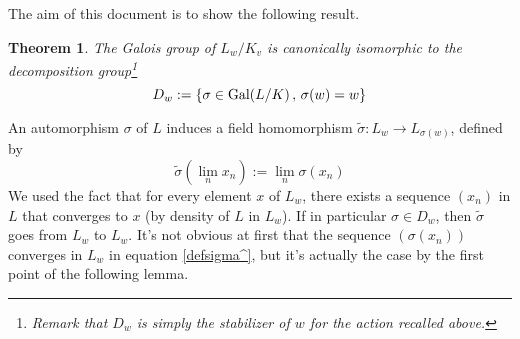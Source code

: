 \documentclass[12pt,a4paper,english]{article}
\theoremstyle{definition}
\theoremstyle{plain}
\newtheorem*{thm}{Theorem}
\begin{document}
The aim of this document is to show the following result.
\vspace{0.5cm}

\begin{thm}
The Galois group of $L_w/K_v$ is canonically isomorphic to the decomposition group\footnote{Remark that $D_w$ is simply the stabilizer of $w$ for the action recalled above.}
\begin{equation*}
    D_w:=\{\sigma\in\text{\normalfont Gal}(L/K)\,,\, \sigma(w)=w\}
\end{equation*}
\end{thm}
\vspace{1cm}

An automorphism $\sigma$ of $L$ induces a field homomorphism $\widetilde{\sigma}:L_w\longrightarrow L_{\sigma(w)}$, defined by
\begin{equation}\label{defsigma^}
	\widetilde{\sigma}(\lim_n x_n):=\lim_n \sigma(x_n)
\end{equation}
We used the fact that for every element $x$ of $L_w$, there exists a sequence $(x_n)$ in $L$ that converges to $x$ (by density of $L$ in $L_w$). If in particular $\sigma\in D_w$, then $\widetilde{\sigma}$ goes from $L_w$ to $L_w$. It's not obvious at first that the sequence $(\sigma(x_n))$ converges in $L_w$ in equation \eqref{defsigma^}, but it's actually the case by the first point of the following lemma.
\end{document}
